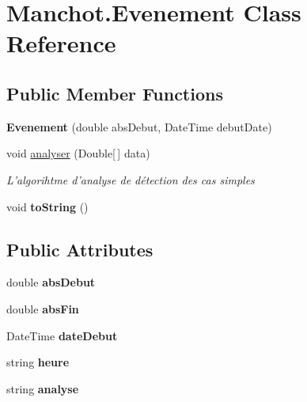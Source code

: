 \hypertarget{class_manchot_1_1_evenement}{\section{Manchot.\+Evenement Class Reference}
\label{class_manchot_1_1_evenement}
}
\subsection*{Public Member Functions}
\begin{DoxyCompactItemize}
\item 
\hypertarget{class_manchot_1_1_evenement_a34158d2e84e6c90e0d5aaa41da97c06c}{{\bfseries Evenement} (double abs\+Debut, Date\+Time debut\+Date)}\label{class_manchot_1_1_evenement_a34158d2e84e6c90e0d5aaa41da97c06c}

\item 
void \hyperlink{class_manchot_1_1_evenement_a16500af63cab5260508f510b2c4ab63e}{analyser} (Double\mbox{[}$\,$\mbox{]} data)
\begin{DoxyCompactList}\small\item\em L'algorihtme d'analyse de détection des cas simples \end{DoxyCompactList}\item 
\hypertarget{class_manchot_1_1_evenement_add7952e30aa5b337001eec03281e1515}{void {\bfseries to\+String} ()}\label{class_manchot_1_1_evenement_add7952e30aa5b337001eec03281e1515}

\end{DoxyCompactItemize}
\subsection*{Public Attributes}
\begin{DoxyCompactItemize}
\item 
\hypertarget{class_manchot_1_1_evenement_aa91230c351cec120029e1be48361c1f9}{double {\bfseries abs\+Debut}}\label{class_manchot_1_1_evenement_aa91230c351cec120029e1be48361c1f9}

\item 
\hypertarget{class_manchot_1_1_evenement_a76aac7ad1749ec34ce6b4d0cc45c6719}{double {\bfseries abs\+Fin}}\label{class_manchot_1_1_evenement_a76aac7ad1749ec34ce6b4d0cc45c6719}

\item 
\hypertarget{class_manchot_1_1_evenement_a9a465017ad41a4cd246887a2575207e1}{Date\+Time {\bfseries date\+Debut}}\label{class_manchot_1_1_evenement_a9a465017ad41a4cd246887a2575207e1}

\item 
\hypertarget{class_manchot_1_1_evenement_a2e8354a25ea824281aa00ce6e75bf36d}{string {\bfseries heure}}\label{class_manchot_1_1_evenement_a2e8354a25ea824281aa00ce6e75bf36d}

\item 
\hypertarget{class_manchot_1_1_evenement_a830974e04282d744b6c3b62101601208}{string {\bfseries analyse}}\label{class_manchot_1_1_evenement_a830974e04282d744b6c3b62101601208}

\end{DoxyCompactItemize}


